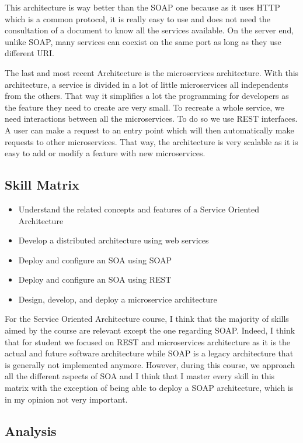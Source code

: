 This architecture is way better than the SOAP one because as it uses HTTP which is a common protocol, it is really easy to use and does not need the consultation of a document to know all the services available. On the server end, unlike SOAP, many services can coexist on the same port as long as they use different URI.
\smallskip 

The last and most recent Architecture is the microservices architecture. With this architecture, a service is divided in a lot of little microservices all independents from the others. That way it simplifies a lot the programming for developers as the feature they need to create are very small. To recreate a whole service, we need interactions between all the microservices. To do so we use REST interfaces. A user can make a request to an entry point which will then automatically make requests to other microservices. That way, the architecture is very scalable as it is easy to add or modify a feature with new microservices.

\subsection{Skill Matrix}

\begin{itemize}
    \item Understand the related concepts and features of a Service Oriented Architecture
    \item Develop a distributed architecture using  web services
    \item Deploy and configure an SOA using SOAP
    \item Deploy and configure an SOA using REST
    \item Design, develop, and deploy a microservice architecture
\end{itemize}

For the Service Oriented Architecture course, I think that the majority of skills aimed by the course are relevant except the one regarding SOAP. Indeed, I think that for student we focused on REST and microservices architecture as it is the actual and future software architecture while SOAP is a legacy architecture that is generally not implemented anymore. However, during this course, we approach all the different aspects of SOA and I think that I master every skill in this matrix with the exception of being able to deploy a SOAP architecture, which is in my opinion not very important.

\subsection{Analysis}

